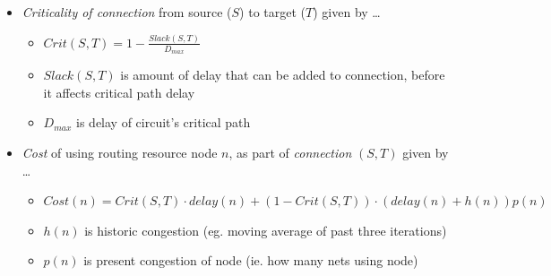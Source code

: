 \documentclass{article}
\begin{document}
\begin{itemize}
    \item \textit{Criticality of connection} from source ($S$) to target ($T$) given by \dots
        \begin{itemize}
            \item $Crit(S,T) = 1 - \frac{Slack(S,T)}{D_{max}}$
            \item $Slack(S,T)$ is amount of delay that can be added to connection, before it affects critical path delay
            \item $D_{max}$ is delay of circuit's critical path
        \end{itemize}
    \item \textit{Cost} of using routing resource node $n$, as part of \textit{connection} $(S,T)$ given by \dots
        \begin{itemize}
            \item $Cost(n) = Crit(S,T) \cdot delay(n) + (1-Crit(S,T)) \cdot (delay(n)+h(n))p(n)$
            \item $h(n)$ is historic congestion (eg. moving average of past three iterations)
            \item $p(n)$ is present congestion of node (ie. how many nets using node)
        \end{itemize}
\end{itemize}
\end{document}
